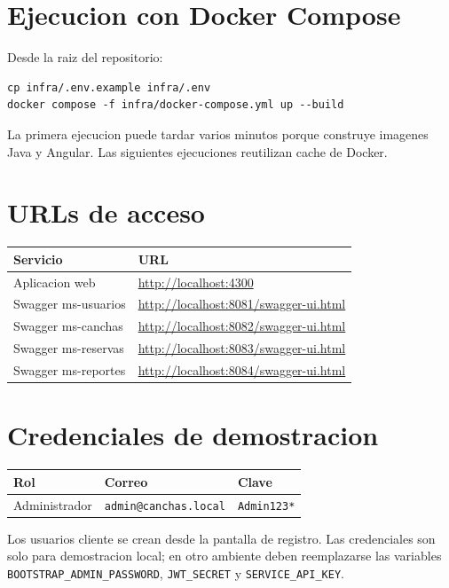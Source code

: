 \documentclass[12pt,a4paper]{article}
\begin{document}
\section{Ejecucion con Docker Compose}

Desde la raiz del repositorio:

\begin{lstlisting}[style=terminal]
cp infra/.env.example infra/.env
docker compose -f infra/docker-compose.yml up --build
\end{lstlisting}

La primera ejecucion puede tardar varios minutos porque construye imagenes Java y Angular. Las siguientes ejecuciones reutilizan cache de Docker.

\section{URLs de acceso}

\begin{longtable}{p{5cm}p{8cm}}
\textbf{Servicio} & \textbf{URL} \\
\hline
Aplicacion web & \url{http://localhost:4300} \\
Swagger ms-usuarios & \url{http://localhost:8081/swagger-ui.html} \\
Swagger ms-canchas & \url{http://localhost:8082/swagger-ui.html} \\
Swagger ms-reservas & \url{http://localhost:8083/swagger-ui.html} \\
Swagger ms-reportes & \url{http://localhost:8084/swagger-ui.html} \\
\end{longtable}

\section{Credenciales de demostracion}

\begin{longtable}{p{4cm}p{5cm}p{4cm}}
\textbf{Rol} & \textbf{Correo} & \textbf{Clave} \\
\hline
Administrador & \texttt{admin@canchas.local} & \texttt{Admin123*} \\
\end{longtable}

Los usuarios cliente se crean desde la pantalla de registro. Las credenciales son solo para demostracion local; en otro ambiente deben reemplazarse las variables \texttt{BOOTSTRAP\_ADMIN\_PASSWORD}, \texttt{JWT\_SECRET} y \texttt{SERVICE\_API\_KEY}.
\end{document}
